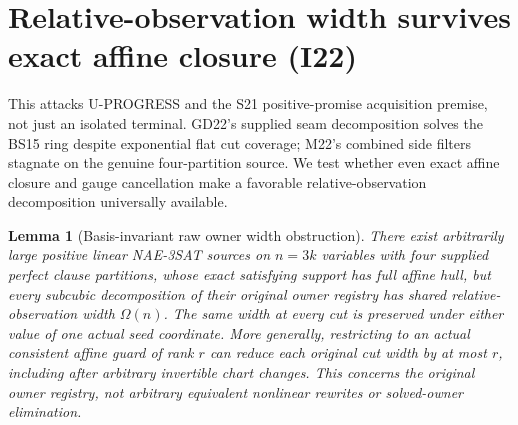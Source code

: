 \documentclass[11pt]{article}
\newtheorem{lemma}[theorem]{Lemma}
\begin{document}
\section{Relative-observation width survives exact affine closure (I22)}\label{sec:i22}
This attacks U-PROGRESS and the S21 positive-promise acquisition premise, not just an isolated terminal. GD22's supplied seam decomposition solves the BS15 ring despite exponential flat cut coverage; M22's combined side filters stagnate on the genuine four-partition source. We test whether even exact affine closure and gauge cancellation make a favorable relative-observation decomposition universally available.

\begin{lemma}[Basis-invariant raw owner width obstruction]\label{lem:i22-width}
There exist arbitrarily large positive linear NAE-3SAT sources on $n=3k$ variables with four supplied perfect clause partitions, whose exact satisfying support has full affine hull, but every subcubic decomposition of their original owner registry has shared relative-observation width $\Omega(n)$. The same width at every cut is preserved under either value of one actual seed coordinate. More generally, restricting to an actual consistent affine guard of rank $r$ can reduce each original cut width by at most $r$, including after arbitrary invertible chart changes. This concerns the original owner registry, not arbitrary equivalent nonlinear rewrites or solved-owner elimination.
\end{lemma}
\end{document}
